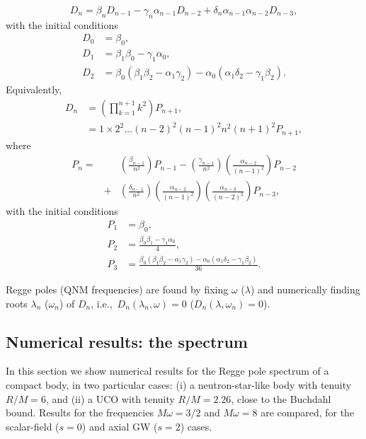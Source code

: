 \documentclass[aps,prd,longbibliography,reprint,twocolumn,amsmath,amssymb,amsfonts,showpacs,footnote,superscriptaddress]{revtex4-1}%
\newcommand{\moh}[1]{\textcolor{green}{(Mohamed: #1)}}
\begin{document}
%
\begin{equation}
\label{derecurrence_4_termes}
D_n=\beta_n D_{n-1} - \gamma_{n}\alpha_{n-1}D_{n-2} + \delta_n \alpha_{n-1} \alpha_{n-2} D_{n-3} ,
\end{equation}
%
with the initial conditions
 \begin{equation}
 \label{Determinant_initial_conds}
 \begin{split}
    D_0 &=\beta_0, \\
    D_1 &=\beta_1\beta_0-\gamma_1\alpha_0 , \\
    D_2 &=\beta_0(\beta_1 \beta_2 - \alpha_1 \gamma_2)- \alpha_0(\alpha_1 \delta_2 -\gamma_1 \beta_2) .
 \end{split}
 \end{equation}
%
Equivalently, %
\begin{align}
\label{recurrence_Hill_RN_4_termes}
D_n    & =\left(\prod_{k=1}^{n+1} k^2\right) P_{n+1} , \nonumber\\
       &  = 1\times 2^2 \ldots (n-2)^2(n-1)^2n^2(n+1)^2 P_{n+1},
\end{align}
where
\begin{eqnarray}
\label{recurrence_Hill_RN_4_termes_bis}
P_n = & & \left(\frac{\beta_{n-1}}{n^2}\right)P_{n-1}-\left(\frac{\gamma_{n-1}}{n^2}\right)\left(\frac{\alpha_{n-2}}{(n-1)^2}\right)P_{n-2} \nonumber \\
  &+& \left(\frac{\delta_{n-1}}{n^2}\right) \left(\frac{\alpha_{n-2}}{(n-1)^2}\right) \left(\frac{\alpha_{n-3}}{(n-2)^2}\right) P_{n-3}
,
\end{eqnarray}
with the initial conditions
 \begin{equation}
 \begin{split}
    P_1&=\beta_0 , \\
    P_2&=\frac{\beta_0\beta_1-\gamma_1\alpha_0}{4} ,\\
    P_3&=\frac{\beta_0(\beta_1 \beta_2 - \alpha_1 \gamma_2)- \alpha_0(\alpha_1 \delta_2 -\gamma_1 \beta_2)}{36} .
 \end{split}
 \end{equation}

Regge poles (QNM frequencies) are found by fixing $\omega$ ($\lambda$) and numerically finding roots $\lambda_n$ ($\omega_n$) of $D_n$, i.e.,~$D_n(\lambda_n,\omega)=0$ ($D_n(\lambda,\omega_n)=0$).


 \subsection{Numerical results: the spectrum}\label{subsec:results1}
In this section we show numerical results for the Regge pole spectrum of a compact body, in two particular cases: (i) a neutron-star-like body with tenuity $R / M = 6$, and (ii) a UCO with tenuity $R / M = 2.26$, close to the Buchdahl bound. Results for the frequencies $M \omega = 3/2$ and $M \omega = 8$ are compared, for the scalar-field ($s=0$) and axial GW ($s=2$) cases.
\end{document}
